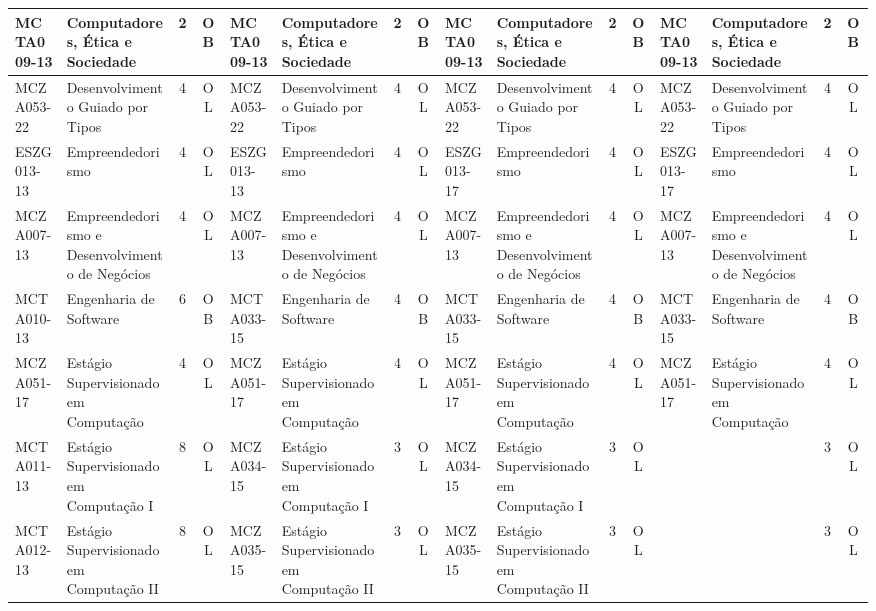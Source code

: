 \documentclass[a4paper]{article}
\begin{document}
\begin{landscape}
{\begin{longtable}{|l|p{.15\textheight}|c|c||l|p{.15\textheight}|c|c||l|p{.15\textheight}|c|c||l|p{.15\textheight}|c|c|}
    MCTA009-13 & Computadores, Ética e Sociedade & 2 & OB &
    MCTA009-13 & Computadores, Ética e Sociedade & 2 & OB &
    MCTA009-13 & Computadores, Ética e Sociedade & 2 & OB &
    MCTA009-13 & Computadores, Ética e Sociedade & 2 & OB \\ \hline

    MCZA053-22 & Desenvolvimento Guiado por Tipos & 4 & OL &
    MCZA053-22 & Desenvolvimento Guiado por Tipos & 4 & OL &
    MCZA053-22 & Desenvolvimento Guiado por Tipos & 4 & OL &
    MCZA053-22 & Desenvolvimento Guiado por Tipos & 4 & OL\\ \hline

    ESZG013-13 & Empreendedorismo & 4 & OL &
    ESZG013-13 & Empreendedorismo & 4 & OL &
    ESZG013-17 & Empreendedorismo & 4 & OL &
    ESZG013-17 & Empreendedorismo & 4 & OL \\ \hline
    
    MCZA007-13 & Empreendedorismo e Desenvolvimento de Negócios & 4 & OL &
    MCZA007-13 & Empreendedorismo e Desenvolvimento de Negócios & 4 & OL &
    MCZA007-13 & Empreendedorismo e Desenvolvimento de Negócios & 4 & OL &
    MCZA007-13 & Empreendedorismo e Desenvolvimento de Negócios & 4 & OL \\ \hline

    MCTA010-13 & Engenharia de Software & 6 &  OB &
    MCTA033-15 & Engenharia de Software & 4 &  OB &
    MCTA033-15 & Engenharia de Software & 4 &  OB &
    MCTA033-15 & Engenharia de Software & 4 &  OB \\ \hline

    MCZA051-17 & Estágio Supervisionado em Computação & 4 & OL &
    MCZA051-17 & Estágio Supervisionado em Computação & 4 & OL &
    MCZA051-17 & Estágio Supervisionado em Computação & 4 & OL &
    MCZA051-17 & Estágio Supervisionado em Computação & 4 & OL \\ \hline

    MCTA011-13 & Estágio Supervisionado em Computação I & 8 & OL &
    MCZA034-15 & Estágio Supervisionado em Computação I & 3 & OL &
    MCZA034-15 & Estágio Supervisionado em Computação I & 3 & OL &
               &                                        & 3 & OL \\ \hline

    MCTA012-13 & Estágio Supervisionado em Computação II & 8 & OL &
    MCZA035-15 & Estágio Supervisionado em Computação II & 3 & OL &
    MCZA035-15 & Estágio Supervisionado em Computação II & 3 & OL &
    &  & 3 & OL \\ \hline


\end{longtable}}
\end{landscape}
\end{document}
